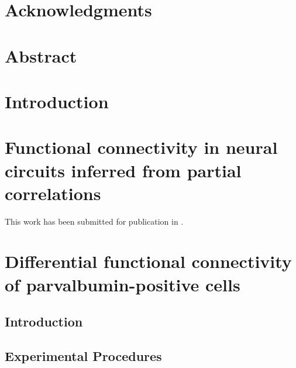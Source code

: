 \documentclass[12pt,letterpaper,titlepage,twoside,openright]{report}
\begin{document}
\chapter*{Acknowledgments}


\chapter*{Abstract}


\tableofcontents

\listoffigures


\chapter{Introduction}
\clearpage 


\chapter{Functional connectivity in neural circuits inferred from partial correlations}
This work has been submitted for publication in .
\clearpage









\chapter{Differential functional connectivity of parvalbumin-positive cells}
\clearpage

\section{Introduction}


\section{Experimental Procedures}




\end{document}
